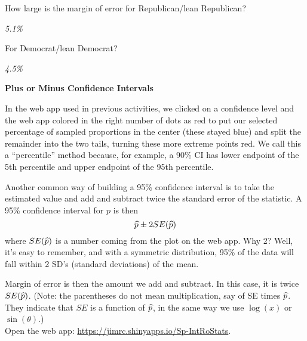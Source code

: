  How large is the margin of error for Republican/lean Republican?
\begin{students}
\vspace{.8cm}
\end{students}

\begin{key}
  {\em 5.1\%}
\end{key}

 For  Democrat/lean Democrat?
\begin{students}
\vspace{.8cm}
\end{students}

\begin{key}
  {\em 4.5\%}
\end{key}

\newpage

\begin{center}
  {\Large \bf Plus or Minus Confidence Intervals}
\end{center}

In the web app used in previous activities, we clicked on a confidence
level and the web app colored in the right number of dots as red to
put our selected percentage of sampled proportions in the center
(these stayed blue) and split the remainder into the two tails,
turning these more extreme points red.  We call this a ``percentile''
method because, for example, a 90\% CI has lower endpoint of the 5th
percentile and upper endpoint of the 95th percentile.

Another common way of building a 95\% confidence interval is to take
the estimated value and add and subtract twice the standard error of
the statistic.  A 95\% confidence interval for $p$ is then
 $$ \widehat{p} \pm 2 SE(\widehat{p})$$
where $SE(\widehat{p})$ is a number coming from the plot on the web app.
Why 2?  Well, it's easy to remember, and with a symmetric
distribution, 95\% of the data will fall within 2 SD's (standard
deviations) of the mean.

Margin of error is then the amount we add and subtract.  In this case,
it is twice $SE(\widehat{p})$.  (Note: the parentheses do not mean
multiplication, say of SE times $\widehat{p}$. They indicate that $SE$ is a
function of $\widehat{p}$, in the same way we use $\log(x)$ or
$\sin(\theta)$.)\\
Open the web app: \url{https://jimrc.shinyapps.io/Sp-IntRoStats}.

